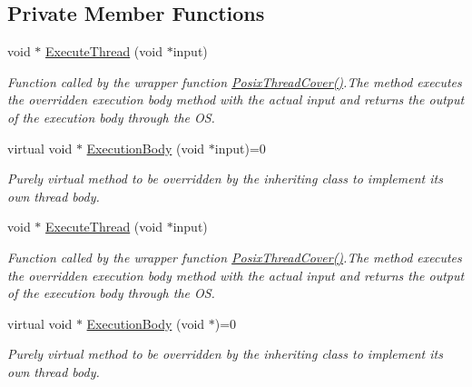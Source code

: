 \subsection*{Private Member Functions}
\begin{DoxyCompactItemize}
\item 
void $\ast$ \hyperlink{class_thread_base_a844dd13473fee9283197b3905a81da45}{Execute\-Thread} (void $\ast$input)
\begin{DoxyCompactList}\small\item\em Function called by the wrapper function \hyperlink{class_thread_base_a2567acd55e8bbdbf8ac90a8f77bb4943}{Posix\-Thread\-Cover()}.The method executes the overridden execution body method with the actual input and returns the output of the execution body through the O\-S. \end{DoxyCompactList}\item 
virtual void $\ast$ \hyperlink{class_thread_base_a9904309fcfb4dce33130ef1f1a1c227e}{Execution\-Body} (void $\ast$input)=0
\begin{DoxyCompactList}\small\item\em Purely virtual method to be overridden by the inheriting class to implement its own thread body. \end{DoxyCompactList}\item 
void $\ast$ \hyperlink{class_thread_base_a844dd13473fee9283197b3905a81da45}{Execute\-Thread} (void $\ast$input)
\begin{DoxyCompactList}\small\item\em Function called by the wrapper function \hyperlink{class_thread_base_a2567acd55e8bbdbf8ac90a8f77bb4943}{Posix\-Thread\-Cover()}.The method executes the overridden execution body method with the actual input and returns the output of the execution body through the O\-S. \end{DoxyCompactList}\item 
virtual void $\ast$ \hyperlink{class_thread_base_a2cbbb5fb63f5e92d32085b6e874b6f29}{Execution\-Body} (void $\ast$)=0
\begin{DoxyCompactList}\small\item\em Purely virtual method to be overridden by the inheriting class to implement its own thread body. \end{DoxyCompactList}\end{DoxyCompactItemize}
